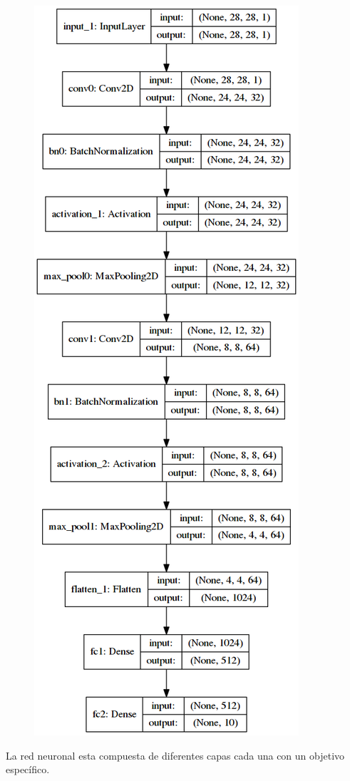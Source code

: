 \documentclass{article}
\begin{document}
\begin{figure}[H]
  \includegraphics[scale=.40]{model_plot}
\end{figure}
La red neuronal esta compuesta de diferentes capas cada una con un objetivo espec\'ifico.
\end{document}
